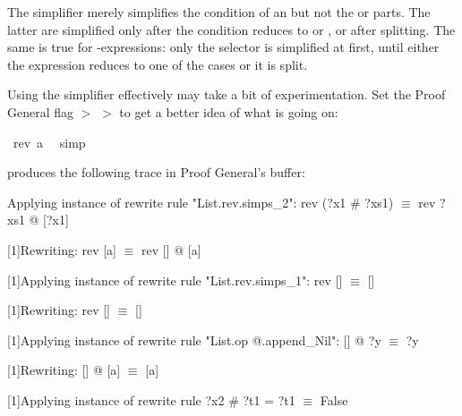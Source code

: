 \begin{isabellebody}
\begin{isamarkuptxt}
\begin{warn}
  The simplifier merely simplifies the condition of an 
   but not the
   or  parts. The latter are simplified only after the
  condition reduces to  or , or after splitting. The
  same is true for -expressions: only the selector is
  simplified at first, until either the expression reduces to one of the
  cases or it is split.
\end{warn}%
\end{isamarkuptxt}%
\isamarkuptrue%
%
\endisatagproof
{\isafoldproof}%
%
\isadelimproof
%
\endisadelimproof
%
\isamarkuptrue%
%
\begin{isamarkuptext}%
Using the simplifier effectively may take a bit of experimentation.  Set the
Proof General flag  $>$  $>$  to get a better idea of what is going on:%
\end{isamarkuptext}%
\isamarkuptrue%
\isamarkupfalse%
\ {\isachardoublequoteopen}rev\ {\isacharbrackleft}a{\isacharbrackright}\ {\isacharequal}\ {\isacharbrackleft}{\isacharbrackright}{\isachardoublequoteclose}\isanewline
%
\isadelimproof
%
\endisadelimproof
%
\isatagproof
{}\isamarkupfalse%
{\isacharparenleft}simp{\isacharparenright}%
\endisatagproof
{\isafoldproof}%
%
\isadelimproof
%
\endisadelimproof
%
\begin{isamarkuptext}%
\noindent
produces the following trace in Proof General's  buffer:

\begin{ttbox}\makeatother
[1]Applying instance of rewrite rule "List.rev.simps_2":
rev (?x1 # ?xs1) \(\equiv\) rev ?xs1 @ [?x1]

[1]Rewriting:
rev [a] \(\equiv\) rev [] @ [a]

[1]Applying instance of rewrite rule "List.rev.simps_1":
rev [] \(\equiv\) []

[1]Rewriting:
rev [] \(\equiv\) []

[1]Applying instance of rewrite rule "List.op @.append_Nil":
[] @ ?y \(\equiv\) ?y

[1]Rewriting:
[] @ [a] \(\equiv\) [a]

[1]Applying instance of rewrite rule
?x2 # ?t1 = ?t1 \(\equiv\) False


\end{ttbox}
\end{isamarkuptext}
\end{isabellebody}
